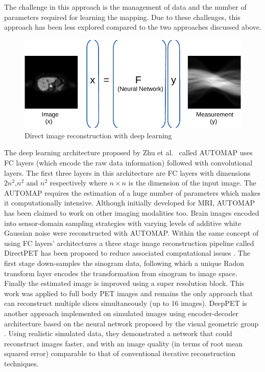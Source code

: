 The challenge in this approach is the management of data and the number of parameters required for learning the mapping. Due to these challenges, this approach has been less explored compared to the two approaches discussed above. 


\begin{figure}[!htbp]
	\centering
	\includegraphics[width=0.8\linewidth]{./Figures/direct-crop.pdf}
	\caption{Direct image reconstruction with deep learning}
	\label{fig:direct}
\end{figure}

The deep learning architecture proposed by Zhu et al.~\cite{zhu2018image} called AUTOMAP uses \ac{FC} layers (which encode the raw data information) followed with convolutional layers.
The first three layers in this architecture are \ac{FC} layers with dimensions $2n^2$,$n^2$ and $n^2$ respectively where $n\times{}n$ is the dimension of the input image. The AUTOMAP requires the estimation of a huge number of parameters which makes it computationally intensive. Although initially developed for \ac{MRI}, AUTOMAP has been claimed to work on other imaging modalities too. Brain images encoded into sensor-domain sampling strategies with varying levels of additive white Gaussian noise were reconstructed with AUTOMAP.  Within the same concept of using \ac{FC} layers' architectures a three stage image reconstruction pipeline called DirectPET has been proposed to reduce associated computational issues  \cite{whiteley2019direct}. The first stage down-samples the sinogram data, following which a unique Radon transform layer encodes the transformation from sinogram to image space. Finally the estimated image is improved using a super resolution block. This work was applied to full body \ac{PET} images and remains the only approach that can reconstruct multiple slices simultaneously (up to 16 images). DeepPET is another approach implemented on simulated images using encoder-decoder architecture based on the neural network proposed by the visual geometric group \cite{haeggstroem2018deeprec}. Using realistic simulated data, they demonstrated a network that could reconstruct images faster, and with an image quality (in terms of root mean squared error) comparable to that of conventional iterative reconstruction techniques.  


